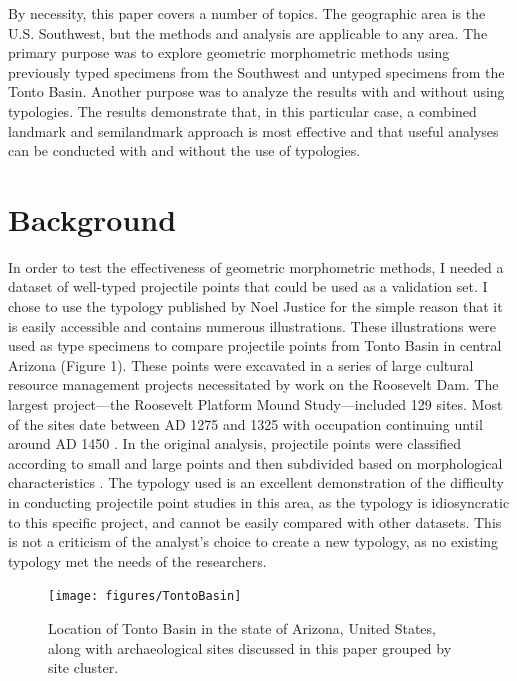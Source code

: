\documentclass[letterpaper]{article}
\begin{document}
By necessity, this paper covers a number of topics. The geographic area is the U.S. Southwest, but the methods and analysis are applicable to any area. The primary purpose was to explore geometric morphometric methods using previously typed specimens from the Southwest and untyped specimens from the Tonto Basin. Another purpose was to analyze the results with and without using typologies. The results demonstrate that, in this particular case, a combined landmark and semilandmark approach is most effective and that useful analyses can be conducted with and without the use of typologies.

\hypertarget{background}{%
\section*{Background}\label{background}}

In order to test the effectiveness of geometric morphometric methods, I needed a dataset of well-typed projectile points that could be used as a validation set. I chose to use the typology published by Noel Justice \autocite*{Justice2002-cf} for the simple reason that it is easily accessible and contains numerous illustrations. These illustrations were used as type specimens to compare projectile points from Tonto Basin in central Arizona (Figure 1). These points were excavated in a series of large cultural resource management projects necessitated by work on the Roosevelt Dam. The largest project---the Roosevelt Platform Mound Study---included 129 sites. Most of the sites date between AD 1275 and 1325 with occupation continuing until around AD 1450 \autocite{Rice1998-ku}. In the original analysis, projectile points were classified according to small and large points and then subdivided based on morphological characteristics \autocite[p.727]{Rice1994-rk}. The typology used is an excellent demonstration of the difficulty in conducting projectile point studies in this area, as the typology is idiosyncratic to this specific project, and cannot be easily compared with other datasets. This is not a criticism of the analyst's choice to create a new typology, as no existing typology met the needs of the researchers.

\begin{figure}
\texttt{[image: figures/TontoBasin]} \caption{Location of Tonto Basin in the state of Arizona, United States, along with archaeological sites discussed in this paper grouped by site cluster.}\label{fig:TontoBasinMap}
\end{figure}
\end{document}
